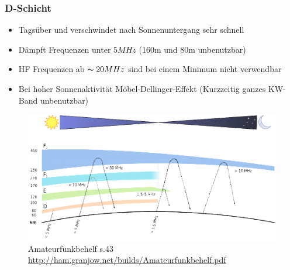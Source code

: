 \begin{frame}
    \frametitle{D-Schicht}
    \begin{itemize}
    			\item Tagsüber und verschwindet nach Sonnenuntergang sehr schnell
			\item Dämpft Frequenzen unter $5MHz$ (160m und 80m unbenutzbar)
                        \item HF Frequenzen ab $\thicksim20MHz$ sind bei einem Minimum nicht verwendbar
       		 	\item Bei hoher Sonnenaktivität Möbel-Dellinger-Effekt (Kurzzeitig ganzes KW-Band unbenutzbar)
    \end{itemize}
    \begin{center}
       \begin{figure}
      \includegraphics[width=.6\textwidth,height=.4\textheight,keepaspectratio]{e09/schichten_behelf_43.png}
      \caption{Amateurfunkbehelf s.43 \ExternalLink \url{http://ham.granjow.net/builds/Amateurfunkbehelf.pdf}}
    \end{figure}
    \end{center}
\end{frame}

